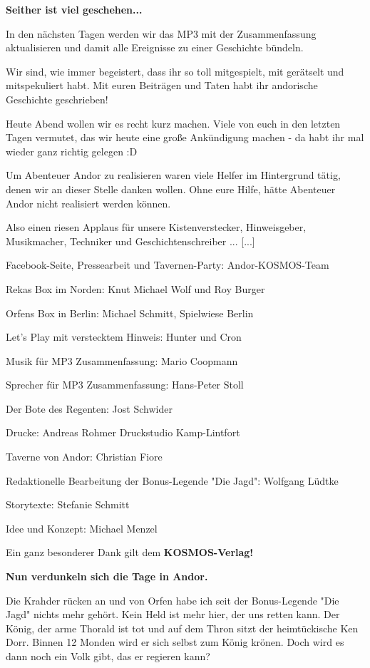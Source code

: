 \documentclass[10pt, a4paper, oneside]{book}
\begin{document}
\begin{multicols}{2}
\textbf{Seither ist viel geschehen...}

In den nächsten Tagen werden wir das MP3 mit der Zusammenfassung aktualisieren und damit alle Ereignisse zu einer Geschichte bündeln.

Wir sind, wie immer begeistert, dass ihr so toll mitgespielt, mit gerätselt und mitspekuliert habt. Mit euren Beiträgen und Taten habt ihr andorische Geschichte geschrieben!

Heute Abend wollen wir es recht kurz machen. Viele von euch in den letzten Tagen vermutet, das wir heute eine große Ankündigung machen - da habt ihr mal wieder ganz richtig gelegen :D

Um Abenteuer Andor zu realisieren waren viele Helfer im Hintergrund tätig, denen wir an dieser Stelle danken wollen. Ohne eure Hilfe, hätte Abenteuer Andor nicht realisiert werden können.

Also einen riesen Applaus für unsere Kistenverstecker, Hinweisgeber, Musikmacher, Techniker und Geschichtenschreiber ... [...]

Facebook-Seite, Pressearbeit und Tavernen-Party: Andor-KOSMOS-Team

Rekas Box im Norden: Knut Michael Wolf und Roy Burger

Orfens Box in Berlin: Michael Schmitt, Spielwiese Berlin

Let’s Play mit verstecktem Hinweis: Hunter und Cron

Musik für MP3 Zusammenfassung: Mario Coopmann

Sprecher für MP3 Zusammenfassung: Hans-Peter Stoll

Der Bote des Regenten: Jost Schwider

Drucke: Andreas Rohmer Druckstudio Kamp-Lintfort

Taverne von Andor: Christian Fiore

Redaktionelle Bearbeitung der Bonus-Legende "Die Jagd": Wolfgang Lüdtke

Storytexte: Stefanie Schmitt

Idee und Konzept: Michael Menzel

Ein ganz besonderer Dank gilt dem \textbf{KOSMOS-Verlag!}

\textbf{Nun verdunkeln sich die Tage in Andor.}

Die Krahder rücken an und von Orfen habe ich seit der Bonus-Legende "Die Jagd" nichts mehr gehört. Kein Held ist mehr hier, der uns retten kann. Der König, der arme Thorald ist tot und auf dem Thron sitzt der heimtückische Ken Dorr. Binnen 12 Monden wird er sich selbst zum König krönen. Doch wird es dann noch ein Volk gibt, das er regieren kann?


\end{multicols}
\end{document}
